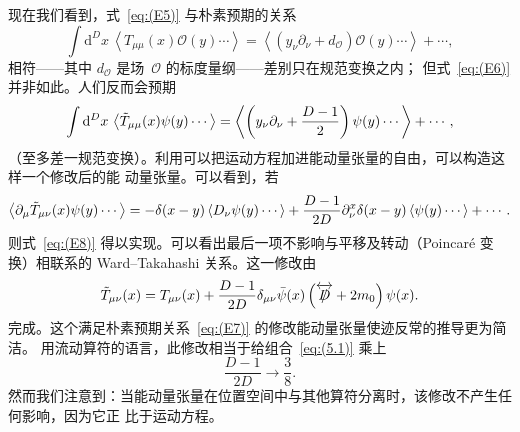 现在我们看到，式~\eqref{eq:(E5)} 与朴素预期的关系
\begin{equation}
   \int\mathrm{d}^Dx\,\left\langle T_{\mu\mu}(x)
   \mathcal{O}(y)\dotsm\right\rangle
   =\left\langle\left(y_\nu\partial_\nu+d_\mathcal{O}\right)
   \mathcal{O}(y)\dotsm\right\rangle+\dotsb,
\label{eq:(E7)}
\end{equation}
相符——其中 $d_{\mathcal{O}}$ 是场~$\mathcal{O}$ 的标度量纲——差别只在规范变换之内；
但式~\eqref{eq:(E6)} 并非如此。人们反而会预期
\begin{equation}
   \int\mathrm{d}^Dx\,\left\langle\Tilde{T}_{\mu\mu}(x)
   \psi(y)\dotsm\right\rangle
   =\left\langle\left(y_\nu\partial_\nu+\frac{D-1}{2}\right)\psi(y)
   \dotsm\right\rangle+\dotsb,
\label{eq:(E8)}
\end{equation}
（至多差一规范变换）。利用可以把运动方程加进能动量张量的自由，可以构造这样一个修改后的能
动量张量。可以看到，若
\begin{equation}
   \left\langle\partial_\mu\Tilde{T}_{\mu\nu}(x)\psi(y)\dotsm\right\rangle
   =-\delta(x-y)
   \left\langle D_\nu \psi(y)\dotsm\right\rangle
   +\frac{D-1}{2D}\partial_\nu^x\delta(x-y)
   \left\langle\psi(y)\dotsm\right\rangle+\dotsb.
\label{eq:(E9)}
\end{equation}
则式~\eqref{eq:(E8)} 得以实现。可以看出最后一项不影响与平移及转动（Poincar\'e
变换）相联系的 Ward--Takahashi 关系。这一修改由
\begin{equation}
   \Tilde{T}_{\mu\nu}(x)=T_{\mu\nu}(x)
   +\frac{D-1}{2D}
   \delta_{\mu\nu}
   \Bar{\psi}(x)\left(\overleftrightarrow{\Slash{D}}+2m_0\right)\psi(x).
\label{eq:(E10)}
\end{equation}
完成。这个满足朴素预期关系~\eqref{eq:(E7)} 的修改能动量张量使迹反常的推导更为简洁。
用流动算符的语言，此修改相当于给组合~\eqref{eq:(5.1)} 乘上
\begin{equation}
   \frac{D-1}{2D}\to\frac{3}{8}.
\end{equation}
然而我们注意到：当能动量张量在位置空间中与其他算符分离时，该修改不产生任何影响，因为它正
比于运动方程。
